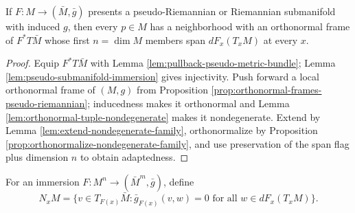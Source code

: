 \begin{proposition}
\label{prop:pseudo-riemannian-adapted-frame}





If $F:M\to(\bar M,\bar g)$ presents a pseudo-Riemannian or Riemannian submanifold with induced $g$, then every $p\in M$ has a neighborhood with an orthonormal frame of $F^*T\bar M$ whose first $n=\dim M$ members span $dF_x(T_xM)$ at every $x$.
\end{proposition}
\begin{proof}

\sketch Equip $F^*T\bar M$ with Lemma \ref{lem:pullback-pseudo-metric-bundle}; Lemma \ref{lem:pseudo-submanifold-immersion} gives injectivity. Push forward a local orthonormal frame of $(M,g)$ from Proposition \ref{prop:orthonormal-frames-pseudo-riemannian}; inducedness makes it orthonormal and Lemma \ref{lem:orthonormal-tuple-nondegenerate} makes it nondegenerate. Extend by Lemma \ref{lem:extend-nondegenerate-family}, orthonormalize by Proposition \ref{prop:orthonormalize-nondegenerate-family}, and use preservation of the span flag plus dimension $n$ to obtain adaptedness.
\end{proof}

\begin{definition}
\label{def:pseudo-normal-space}





For an immersion $F:M^n\to(\bar M^m,\bar g)$, define
\[
N_xM=\{v\in T_{F(x)}\bar M:\bar g_{F(x)}(v,w)=0\text{ for all }w\in dF_x(T_xM)\}.
\]
\end{definition}

